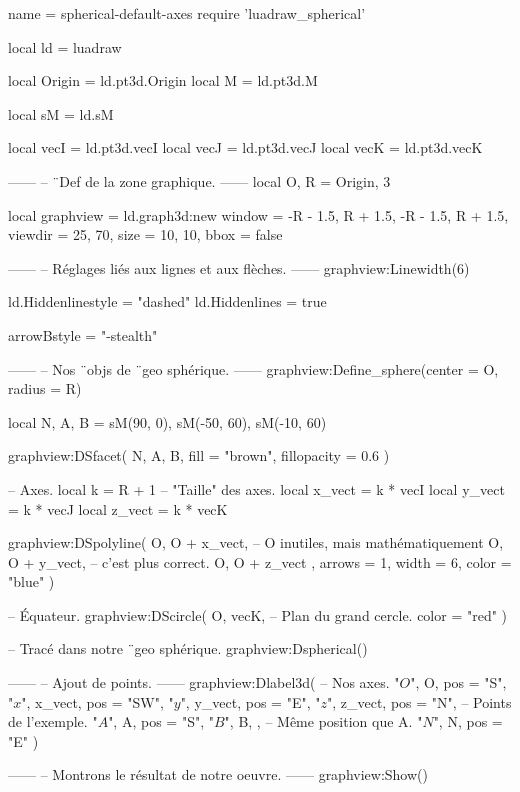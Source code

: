 \documentclass[border = 3pt]{standalone}
\begin{document}
\begin{luadraw*}{name = spherical-default-axes}
require 'luadraw_spherical'

local ld = luadraw

local Origin = ld.pt3d.Origin
local M      = ld.pt3d.M

local sM = ld.sM

local vecI = ld.pt3d.vecI
local vecJ = ld.pt3d.vecJ
local vecK = ld.pt3d.vecK

------
-- ¨Def de la zone graphique.
------
local O, R = Origin, 3

local graphview = ld.graph3d:new{
  window  = {-R - 1.5, R + 1.5, -R - 1.5, R + 1.5},
  viewdir = {25, 70},
  size    = {10, 10},
  bbox    = false
}

------
-- Réglages liés aux lignes et aux flèches.
------
graphview:Linewidth(6)

ld.Hiddenlinestyle = "dashed"
ld.Hiddenlines     = true

arrowBstyle = "-stealth"

------
-- Nos ¨objs de ¨geo sphérique.
------
graphview:Define_sphere({center = O, radius = R})

local N, A, B = sM(90, 0), sM(-50, 60), sM(-10, 60)

graphview:DSfacet(
  {N, A, B},
  {fill = "brown", fillopacity = 0.6}
)

-- Axes.
local k      = R + 1     -- "Taille" des axes.
local x_vect = k * vecI
local y_vect = k * vecJ
local z_vect = k * vecK

graphview:DSpolyline(
  {
    {O, O + x_vect},  -- O inutiles, mais mathématiquement
    {O, O + y_vect},  -- c'est plus correct.
    {O, O + z_vect}
  },
  {arrows = 1, width = 6, color = "blue"}
)

-- Équateur.
graphview:DScircle(
  {O, vecK},       -- Plan du grand cercle.
  {color = "red"}
)

-- Tracé dans notre ¨geo sphérique.
graphview:Dspherical()

------
-- Ajout de points.
------
graphview:Dlabel3d(
-- Nos axes.
  "$O$", O, {pos = "S"},
  "$x$", x_vect, {pos = "SW"},
  "$y$", y_vect, {pos = "E"},
  "$z$", z_vect, {pos = "N"},
-- Points de l'exemple.
  "$A$", A, {pos = "S"},
  "$B$", B, {},           -- Même position que A.
  "$N$", N, {pos = "E"}
)

------
-- Montrons le résultat de notre oeuvre.
------
graphview:Show()
\end{luadraw*}
\end{document}
